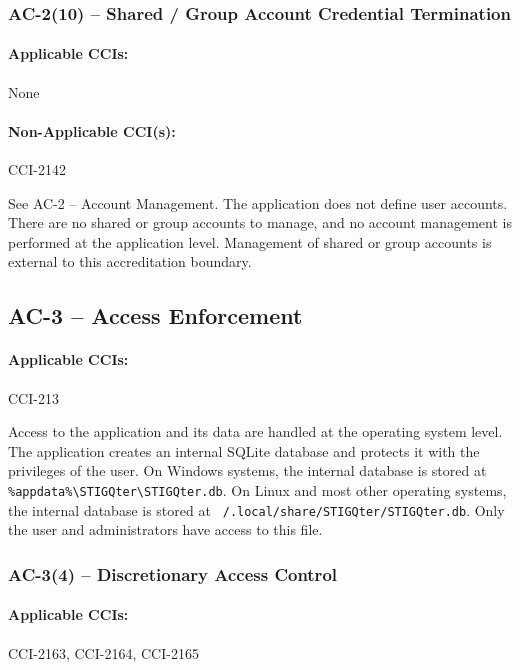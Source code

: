 \documentclass[letterpaper, 10pt, twoside]{article}
\begin{document}
\subsubsection{AC-2(10) -- Shared / Group Account Credential Termination}

\paragraph{Applicable CCIs:} None

\paragraph{Non-Applicable CCI(s):} CCI-2142

See AC-2 – Account Management. The application does not define user accounts. There are no shared or group accounts to manage, and no account management is performed at the application level. Management of shared or group accounts is external to this accreditation boundary.

\subsection{AC-3 -- Access Enforcement}
\label{sec:ac-3}

\paragraph{Applicable CCIs:} CCI-213

Access to the application and its data are handled at the operating system level. The application creates an internal SQLite database and protects it with the privileges of the user. On Windows systems, the internal database is stored at \texttt{\%appdata\%\textbackslash\allowbreak STIGQter\textbackslash\allowbreak STIGQter.db}. On Linux and most other operating systems, the internal database is stored at \texttt{~/.local/\allowbreak share/\allowbreak STIGQter/\allowbreak STIGQter.db}. Only the user and administrators have access to this file.

\subsubsection{AC-3(4) -- Discretionary Access Control}

\paragraph{Applicable CCIs:} CCI-2163, CCI-2164, CCI-2165
\end{document}
